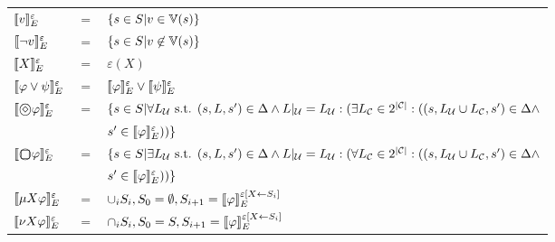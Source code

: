 \vspace{1em}
\begin{tabular}{ l c l }
	$\llbracket v \rrbracket^{\varepsilon}_{E}$ &$=$& $\{s \in S | v \in \mathbb{V}(s)\}$\\
	$\llbracket \neg v \rrbracket^{\varepsilon}_{E}$ &$=$& $\{s \in S | v \not \in \mathbb{V}(s)\}$\\	
	$\llbracket X \rrbracket^{\varepsilon}_{E}$ &$=$& $\varepsilon(X)$\\	
	$\llbracket \varphi \vee \psi \rrbracket^{\varepsilon}_{E}$ &$=$& $\llbracket \varphi \rrbracket^{\varepsilon}_{E} \vee \llbracket \psi \rrbracket^{\varepsilon}_{E}$\\		
	$\valuateSetE{\odiamond \varphi}$ &$=$& $\{s \in S | \forall L_{\mathcal{U}}\text{ s.t. }  (s, L, s') \in \Delta \wedge L|_{\mathcal{U}} = L_{\mathcal{U}}:( \exists L_{\mathcal{C}} \in 2^{|\mathcal{C}|}: ((s, L_{\mathcal{U}} \cup L_{\mathcal{C}}, s') \in \Delta \wedge$\\
	&&$s' \in \llbracket \varphi \rrbracket^{\varepsilon}_{E}))  \}$\\		
	$\valuateSetE{\osquare \varphi}$ &$=$& $\{s \in S | \exists L_{\mathcal{U}}\text{ s.t. }  (s, L, s') \in \Delta \wedge L|_{\mathcal{U}} = L_{\mathcal{U}}:( \forall L_{\mathcal{C}} \in 2^{|\mathcal{C}|}: ((s, L_{\mathcal{U}} \cup L_{\mathcal{C}}, s') \in \Delta \wedge$\\
	&&$s' \in \llbracket \varphi \rrbracket^{\varepsilon}_{E}))  \}$\\				
	$\llbracket \mu X \varphi \rrbracket^{\varepsilon}_{E}$ &$=$& $\cup_i S_i, S_0 = \emptyset, S_{i+1} = \llbracket \varphi \rrbracket^{\varepsilon[X \leftarrow S_i]}_{E}$\\		
	$\llbracket \nu X \varphi \rrbracket^{\varepsilon}_{E}$ &$=$& $\cap_i S_i, S_0 = S, S_{i+1} = \llbracket \varphi \rrbracket^{\varepsilon[X \leftarrow S_i]}_{E}$\\					
\end{tabular}
\vspace{1em}
\\
